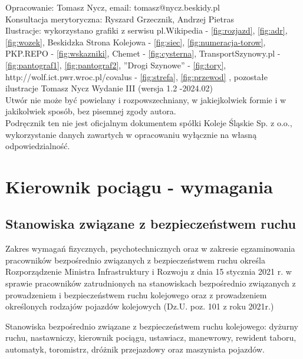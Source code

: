 \documentclass[usenames,dvipsnames,svgnames,table,a4paper,openany,justified]{kaobook}
\begin{document}
Opracowanie: Tomasz Nycz, email: tomasz@nycz.beskidy.pl\\
Konsultacja merytoryczna: Ryszard Grzecznik, Andrzej Pietras\\
Ilustracje: wykorzystano grafiki z serwisu pl.Wikipedia - \ref{fig:rozjazd}, \ref{fig:adr}, \ref{fig:wozek}, Beskidzka Strona Kolejowa  - \ref{fig:siec}, \ref{fig:numeracja-torow}, PKP.REPO - \ref{fig:wskazniki}, Chemet - \ref{fig:cysterna}, TransportSzynowy.pl - \ref{fig:pantograf1}, \ref{fig:pantograf2}, ''Drogi Szynowe'' - \ref{fig:tory}, http://wolf.ict.pwr.wroc.pl/covalus - \ref{fig:strefa}, \ref{fig:przewod} , pozostałe ilustracje Tomasz Nycz
\vfill
Wydanie III (wersja 1.2 -2024.02)\\
Utwór nie może być powielany i rozpowszechniany, w jakiejkolwiek formie
i w jakikolwiek sposób, bez pisemnej zgody autora.  
\\Podręcznik ten nie jest oficjalnym dokumentem spółki Koleje Śląskie Sp. z o.o., wykorzystanie danych zawartych w opracowaniu wyłącznie na własną odpowiedzialność. 
\tableofcontents
\part{Kierownik pociągu - wymagania}
\chapter{Stanowiska związane z bezpieczeństwem ruchu}
Zakres wymagań fizycznych, psychotechnicznych oraz w zakresie egzaminowania pracowników bezpośrednio związanych z bezpieczeństwem ruchu określa Rozporządzenie Ministra Infrastruktury i Rozwoju z dnia 15 stycznia 2021 r. w sprawie pracowników zatrudnionych na stanowiskach bezpośrednio związanych z prowadzeniem i bezpieczeństwem ruchu kolejowego oraz z prowadzeniem określonych rodzajów pojazdów kolejowych (Dz.U. poz. 101 z roku 2021r.)

Stanowiska bezpośrednio związane z bezpieczeństwem ruchu kolejowego: dyżurny ruchu, nastawniczy, kierownik pociągu, ustawiacz, manewrowy, rewident taboru, automatyk, toromistrz, dróżnik przejazdowy oraz maszynista pojazdów.
\end{document}

